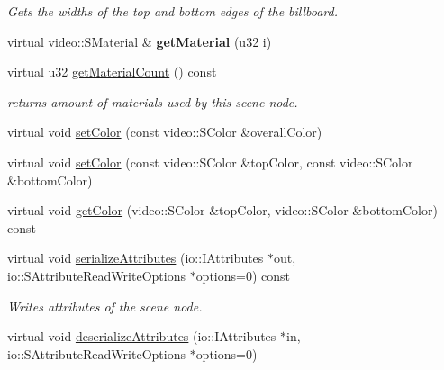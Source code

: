 \begin{DoxyCompactItemize}
\begin{DoxyCompactList}\small\item\em Gets the widths of the top and bottom edges of the billboard. \end{DoxyCompactList}\item 
\hypertarget{classirr_1_1scene_1_1_c_billboard_scene_node_a41eb4f2afe2b88829c3f019feaba2ac7}{virtual video\-::\-S\-Material \& {\bfseries get\-Material} (u32 i)}\label{classirr_1_1scene_1_1_c_billboard_scene_node_a41eb4f2afe2b88829c3f019feaba2ac7}

\item 
\hypertarget{classirr_1_1scene_1_1_c_billboard_scene_node_ab53c7028c92cf473aaebbd1f2e2177dd}{virtual u32 \hyperlink{classirr_1_1scene_1_1_c_billboard_scene_node_ab53c7028c92cf473aaebbd1f2e2177dd}{get\-Material\-Count} () const }\label{classirr_1_1scene_1_1_c_billboard_scene_node_ab53c7028c92cf473aaebbd1f2e2177dd}

\begin{DoxyCompactList}\small\item\em returns amount of materials used by this scene node. \end{DoxyCompactList}\item 
virtual void \hyperlink{classirr_1_1scene_1_1_c_billboard_scene_node_a570348674f30b27f511398c9120a7be6}{set\-Color} (const video\-::\-S\-Color \&overall\-Color)
\item 
virtual void \hyperlink{classirr_1_1scene_1_1_c_billboard_scene_node_ad05a99bf56f308c165cdaf6a241cc684}{set\-Color} (const video\-::\-S\-Color \&top\-Color, const video\-::\-S\-Color \&bottom\-Color)
\item 
virtual void \hyperlink{classirr_1_1scene_1_1_c_billboard_scene_node_a0c1235560a8e9b823f057139cb785dc0}{get\-Color} (video\-::\-S\-Color \&top\-Color, video\-::\-S\-Color \&bottom\-Color) const 
\item 
\hypertarget{classirr_1_1scene_1_1_c_billboard_scene_node_af6e10a11865ecebdbc9e349871137e25}{virtual void \hyperlink{classirr_1_1scene_1_1_c_billboard_scene_node_af6e10a11865ecebdbc9e349871137e25}{serialize\-Attributes} (io\-::\-I\-Attributes $\ast$out, io\-::\-S\-Attribute\-Read\-Write\-Options $\ast$options=0) const }\label{classirr_1_1scene_1_1_c_billboard_scene_node_af6e10a11865ecebdbc9e349871137e25}

\begin{DoxyCompactList}\small\item\em Writes attributes of the scene node. \end{DoxyCompactList}\item 
\hypertarget{classirr_1_1scene_1_1_c_billboard_scene_node_a2bc846a09e82b87fe5678b74a5b219cf}{virtual void \hyperlink{classirr_1_1scene_1_1_c_billboard_scene_node_a2bc846a09e82b87fe5678b74a5b219cf}{deserialize\-Attributes} (io\-::\-I\-Attributes $\ast$in, io\-::\-S\-Attribute\-Read\-Write\-Options $\ast$options=0)}\label{classirr_1_1scene_1_1_c_billboard_scene_node_a2bc846a09e82b87fe5678b74a5b219cf}


\end{DoxyCompactItemize}
